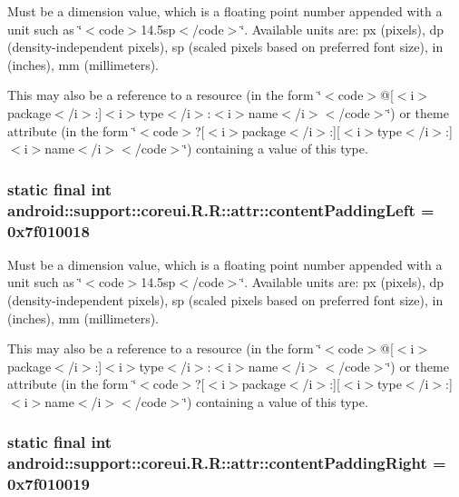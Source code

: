 Must be a dimension value, which is a floating point number appended with a unit such as \char`\"{}$<$code$>$14.5sp$<$/code$>$\char`\"{}. Available units are: px (pixels), dp (density-independent pixels), sp (scaled pixels based on preferred font size), in (inches), mm (millimeters). 

This may also be a reference to a resource (in the form \char`\"{}$<$code$>$@\mbox{[}$<$i$>$package$<$/i$>$:\mbox{]}$<$i$>$type$<$/i$>$:$<$i$>$name$<$/i$>$$<$/code$>$\char`\"{}) or theme attribute (in the form \char`\"{}$<$code$>$?\mbox{[}$<$i$>$package$<$/i$>$:\mbox{]}\mbox{[}$<$i$>$type$<$/i$>$:\mbox{]}$<$i$>$name$<$/i$>$$<$/code$>$\char`\"{}) containing a value of this type. \hypertarget{classandroid_1_1support_1_1coreui_1_1_r_1_1attr_c4de9f68318ecf355a31afaa8fa359c3}{
\subsubsection[{contentPaddingLeft}]{\setlength{\rightskip}{0pt plus 5cm}static final int android::support::coreui.R.R::attr::contentPaddingLeft = 0x7f010018}}
\label{classandroid_1_1support_1_1coreui_1_1_r_1_1attr_c4de9f68318ecf355a31afaa8fa359c3}


Must be a dimension value, which is a floating point number appended with a unit such as \char`\"{}$<$code$>$14.5sp$<$/code$>$\char`\"{}. Available units are: px (pixels), dp (density-independent pixels), sp (scaled pixels based on preferred font size), in (inches), mm (millimeters). 

This may also be a reference to a resource (in the form \char`\"{}$<$code$>$@\mbox{[}$<$i$>$package$<$/i$>$:\mbox{]}$<$i$>$type$<$/i$>$:$<$i$>$name$<$/i$>$$<$/code$>$\char`\"{}) or theme attribute (in the form \char`\"{}$<$code$>$?\mbox{[}$<$i$>$package$<$/i$>$:\mbox{]}\mbox{[}$<$i$>$type$<$/i$>$:\mbox{]}$<$i$>$name$<$/i$>$$<$/code$>$\char`\"{}) containing a value of this type. \hypertarget{classandroid_1_1support_1_1coreui_1_1_r_1_1attr_961aa9c40c53e963223da1e9d8bf2b99}{
\subsubsection[{contentPaddingRight}]{\setlength{\rightskip}{0pt plus 5cm}static final int android::support::coreui.R.R::attr::contentPaddingRight = 0x7f010019}}
\label{classandroid_1_1support_1_1coreui_1_1_r_1_1attr_961aa9c40c53e963223da1e9d8bf2b99}


